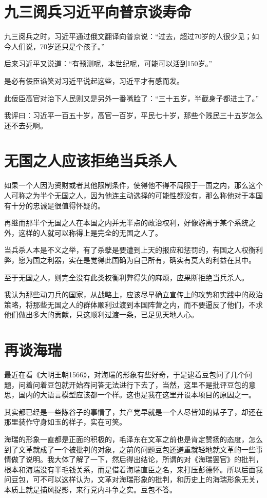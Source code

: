 \documentclass[12pt,oneside]{book}
\begin{document}
\chapter{九三阅兵习近平向普京谈寿命}
九三阅兵之时，习近平通过俄文翻译向普京说：“过去，超过70岁的人很少见；如今人们说，70岁还只是个孩子。”

后来习近平又说道：“有预测呢，本世纪呢，可能可以活到150岁。”

是必有佞臣谄笑对习近平说起这些，习近平才有感而发。

此佞臣高官对治下人民则又是另外一番嘴脸了：“三十五岁，半截身子都进土了。”

我评曰：习近平一百五十岁，高官一百岁，平民七十岁，那些个贱民三十五岁怎么还不去死啊。


\chapter{无国之人应该拒绝当兵杀人}
如果一个人因为资财或者其他限制条件，使得他不得不局限于一国之内，那么这个人可称之为半个无国之人，因为他连主动选择的可能性都没有，那么称他对于本国有十分的忠诚是很值得怀疑的。

再继而那半个无国之人在本国之内并无半点的政治权利，好像游离于某个系统之外，这样的人就可以称得上是完全的无国之人了。

当兵杀人本是不义之举，有了杀孽是要遭到上天的报应和惩罚的，有国之人权衡利弊，愿为国之利器，实在是觉得此国确为自己所有，确实有莫大的利益在其中。

至于无国之人，则完全没有此类权衡利弊得失的麻烦，应果断拒绝当兵杀人。

我认为那些动刀兵的国家，从战略上，应该尽早确立宣传上的攻势和实践中的政治策略，将那些无国之人的群体顺利过渡到本国阵营之内，而不要逼反了他们，不求他们做出多大的贡献，只这顺利过渡一条，已足见天地人心。



\chapter{再谈海瑞}
最近在看《大明王朝1566》，对海瑞的形象有些好奇，于是逮着豆包问了几个问题，问着问着豆包就开始吞问答无法进行下去了，当然，这里不是批评豆包的意思，国内的大语言模型应该都一个样。这也是我在这里开设本项目的原因之一。

其实都已经是一些陈谷子的事情了，共产党早就是一个人尽皆知的婊子了，却还在那里装作守身如玉的样子，实在可笑。

海瑞的形象一直都是正面的积极的，毛泽东在文革之前也是肯定赞扬的态度，怎么到了文革就成了一个被批判的对象，之前的问题豆包还避重就轻地就文革的一些事情做了说明。我大体了解了一下，然后得出结论，所谓的对《海瑞罢官》的批判，根本和海瑞没有半毛钱关系，而是借着海瑞直臣之名，来打压彭德怀。所以后面我问豆包，可不可以这样认为，文革对海瑞形象的批判，和历史上的海瑞形象无关，本质上就是捕风捉影，来行党内斗争之实。豆包不答。
\end{document}
